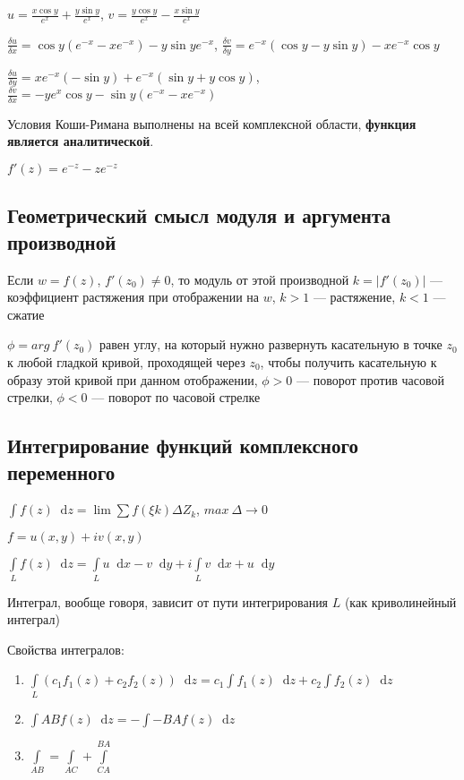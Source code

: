 \documentclass{article}
\newcommand*\diff{\mathop{}\!\mathrm{d}}
\begin{document}
$u = \frac{x \cos y}{e^{x}} + \frac{y \sin y}{e^{x}}$, $v = \frac{y \cos y}{e^{x}} - \frac{x \sin y}{e^{x}}$

$\frac{\delta u}{\delta x} = \cos y (e^{-x} - x e^{-x}) - y \sin y e^{- x}$, $\frac{\delta v}{\delta y} = e^{-x} (\cos y - y \sin y) - x e^{-x} \cos y$

$\frac{\delta u}{\delta y} = x e^{-x} (- \sin y) + e^{-x} (\sin y + y \cos y)$, $\frac{\delta v}{\delta x} = - y e^{x} \cos y - \sin y (e^{-x} - x e^{-x})$

Условия Коши-Римана выполнены на всей комплексной области, \textbf{функция является аналитической}.

$f'(z) = e^{- z} - z e^{-z}$

\subsection{Геометрический смысл модуля и аргумента производной}

Если $w = f(z)$, $f'(z_0) \ne 0$, то модуль от этой производной $k = |f'(z_0)|$ — коэффициент растяжения при отображении на $w$, $k > 1$ — растяжение, $k < 1$ — сжатие

$\phi = arg \ f'(z_0)$ равен углу, на который нужно развернуть касательную в точке $z_0$ к любой гладкой кривой, проходящей через $z_0$, чтобы получить касательную к образу этой кривой при данном отображении, $\phi > 0$ — поворот против часовой стрелки, $\phi < 0$ — поворот по часовой стрелке

\subsection{Интегрирование функций комплексного переменного}

$\int f(z) \diff z = \lim \sum f(\xi k) \Delta Z_{k}$, $max \ \Delta \to 0$

\hfill

$f = u (x, y) + i v (x, y)$

$\int\limits_{L} f(z) \diff z = \int\limits_{L} u \diff x - v \diff y + i \int\limits_{L} v \diff x + u \diff y$

Интеграл, вообще говоря, зависит от пути интегрирования $L$ (как криволинейный интеграл)

\hfill

Свойства интегралов:

\begin{enumerate}
    \item $\int\limits_{L} (c_1 f_1 (z) + c_2 f_2 (z)) \diff z = c_1 \int f_1 (z) \diff z + c_2 \int f_2(z) \diff z$
    \item $\int\limits{A B} f(z) \diff z = - \int\limits-{B A} f(z) \diff z$
    \item $\int\limits_{A B} = \int\limits_{A C} + \int\limits_{C A}^{B A}$
\end{enumerate}
\end{document}
